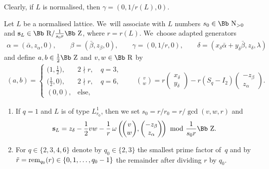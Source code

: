 \documentclass[10pt,a4paper]{amsart}
\newcommand\RR{{\mbox{\Bb R}}}
\newcommand\NN{{\mbox{\Bb N}}}
\newcommand\ZZ{{\mbox{\Bb Z}}}
\newcommand\bs{\textbf{{\rm \textbf{s}}}}
\newcommand{\rem}{\mathop{{\rm rem}}}
\numberwithin{equation}{section}
\begin{document}
Clearly, if $L$ is normalised, then $\gamma=(0,1/r(L),0)$.
%
\begin{Definition}\label{de:inv}
Let $L$ be a normalised lattice. We~will associate with $L$ numbers $s_0\in\NN_{>0}$ and $\bs_L \in \RR/ \frac1{s_0 r}\ZZ $, where $r=r(L)$. We~choose adapted generators
\begin{gather}\label{eq:generators}
\alpha=(\bar\alpha,z_\alpha,0),\qquad
\beta=(\bar\beta,z_\beta,0),\qquad
\gamma=(0,1/r,0),\qquad
\delta=(x_\delta\bar\alpha+y_\delta\bar\beta,z_\delta,\lambda)
\end{gather}
and define $a,b\in \frac12 \ZZ$ and $v,w\in\RR$ by
\begin{gather}\label{abvw}
(a,b)=\begin{cases} \big(1,\frac12\big),& 2\nmid r, \quad q=3,
\\
\big(\frac12,0\big),& 2\nmid r,\quad q=6,
\\
(0,0),& \text{else},
\end{cases}
\qquad
{v\choose w}=r\begin{pmatrix}x_\delta\\y_\delta\end{pmatrix}
-r(S_q-I_2)\begin{pmatrix}-z_\beta\\z_\alpha\end{pmatrix}\!.
\end{gather}
\begin{enumerate}\itemsep=0pt
\item If $q=1$ and $L$ is of type $L^1_{r_0}$, then we set $s_0=r/r_0=r/\gcd(v,w,r)$ and
\begin{gather*}
\bs_L=z_\delta-\frac{1}{2}vw-\frac{1}{r}\,\omega
\left(\!\begin{pmatrix}v\\w\end{pmatrix}\!,\begin{pmatrix}-z_\beta\\z_\alpha\end{pmatrix}\!\right)
\ {\rm mod}\ \frac{1}{s_0r}\ZZ.
\end{gather*}
\item For $q\in\{2,3,4,6\}$ denote by $q_0\in\{2,3\}$ the smallest prime factor of~$q$ and by $\tilde r=\rem_{q_0}(r)\in\{0,1,\dots,q_0-1\}$ the remainder after dividing $r$ by $q_0$.
\begin{enumerate}\itemsep=0pt

\end{enumerate}
\end{enumerate}
\end{Definition}
\end{document}
